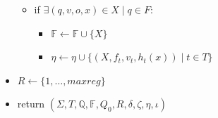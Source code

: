 \documentclass{article}
\newcommand{\Xset}{\!\leftarrow\!}
\newcommand{\Xin}{\!\in\!}
\newcommand{\YF}{\mathbb{F}}
\newcommand{\YQ}{\mathbb{Q}}
\theoremstyle{definition}
\begin{document}
\begin{multicols}{2}
\begin{itemize}[leftmargin=0in]
\begin{itemize}
\begin{itemize}
            \end{itemize}
            \smallskip
            \item[] if $\exists (q, v, o, x) \Xin X \mid q \Xin F$:
            \begin{itemize}
                \item[] $\YF \Xset \YF \cup \{ X \}$
                \item[] $\eta \Xset \eta \cup \{(X, f_t, v_t, h_t(x)) \mid t \Xin T\}$
            \end{itemize}
        \end{itemize}
        \smallskip
        \item[] $R \Xset \{ 1, \dots, maxreg \}$
        \item[] return $(\Sigma, T, \YQ, \YF, Q_0, R, \delta, \zeta, \eta, \iota)$
        \\ \\
    \end{itemize}


\end{multicols}
\end{document}
